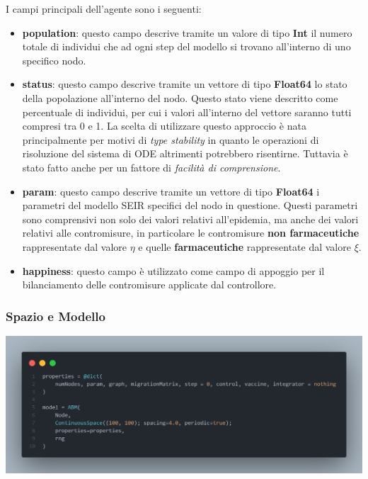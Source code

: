 I campi principali dell'agente sono i seguenti:
\begin{itemize}
	\item \textbf{population}: questo campo descrive tramite un valore di tipo \textbf{Int}
	il numero totale di individui che ad ogni step del modello si trovano all'interno di uno 
	specifico nodo. 
	\item \textbf{status}: questo campo descrive tramite un vettore di tipo \textbf{Float64}
	lo stato della popolazione all'interno del nodo. Questo stato viene descritto come 
	percentuale di individui, per cui i valori all'interno del vettore saranno tutti compresi 
	tra 0 e 1. La scelta di utilizzare questo approccio è nata principalmente per motivi di 
	\emph{type stability} in quanto le operazioni di risoluzione del sistema di ODE altrimenti 
	potrebbero risentirne. Tuttavia è stato fatto anche per un fattore di \emph{facilità di comprensione}.
	\item \textbf{param}: questo campo descrive tramite un vettore di tipo \textbf{Float64}
	i parametri del modello SEIR specifici del nodo in questione. Questi parametri sono comprensivi 
	non solo dei valori relativi all'epidemia, ma anche dei valori relativi alle contromisure, 
	in particolare le contromisure \textbf{non farmaceutiche} rappresentate dal valore \textbf{$\eta$}
	e quelle \textbf{farmaceutiche} rappresentate dal valore \textbf{$\xi$}.
	\item \textbf{happiness}: questo campo è utilizzato come campo di appoggio per il bilanciamento
	delle contromisure applicate dal controllore.
\end{itemize}

\subsubsection{Spazio e Modello}

\begin{minipage}{\linewidth}
    \centering
    \includegraphics[width=\textwidth]{img/sngraph_model.png}
    \label{fig:Model_code}
\end{minipage}

